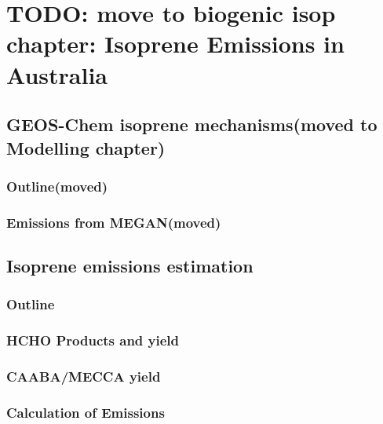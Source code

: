 
\chapter{TODO: move to biogenic isop chapter: Isoprene Emissions in Australia} %
\label{ch_isop}

\section{GEOS-Chem isoprene mechanisms(moved to Modelling chapter)}
  \label{ch_isop:sec:GEOSChemMechanisms}
  \subsection{Outline(moved)}
  \subsection{Emissions from MEGAN(moved)}

\section{Isoprene emissions estimation}
\label{ch_isop:sec:IsopreneEmissions}

  \subsection{Outline}
    
    
    

  \subsection{HCHO Products and yield}
    
  \subsection{CAABA/MECCA yield}
  
  \subsection{Calculation of Emissions}
    \label{ch_isop:sec:EmissionCalculation}
    
